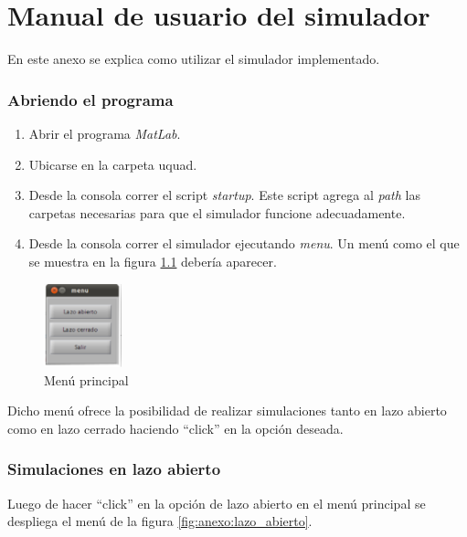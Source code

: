 \documentclass[main]{subfiles}
\begin{document}
\chapter{Manual de usuario del simulador}
\label{chap:anexo_simulador}

En este anexo se explica como utilizar el simulador implementado. 

\subsection*{Abriendo el programa}

\begin{enumerate}
\item Abrir el programa \emph{MatLab}.
\item Ubicarse en la carpeta uquad.
\item Desde la consola correr el script \emph{startup}. Este script agrega al \emph{path} las carpetas necesarias para que el simulador funcione adecuadamente.
\item Desde la consola correr el simulador ejecutando \emph{menu}. Un men\'u como el que se muestra en la figura \ref{fig:menu} deber\'ia aparecer.
\end{enumerate}

\begin{figure}
\centering
  \includegraphics[width=0.2\textwidth]{./pics_anexo_simulador/menu.pdf}
\caption{Men\'u principal}
\label{fig:menu}
\end{figure}
Dicho men\'u ofrece la posibilidad de realizar simulaciones tanto en lazo abierto como en lazo cerrado haciendo ``click'' en la opci\'on deseada.\\

\subsection*{Simulaciones en lazo abierto}
Luego de hacer ``click'' en la opci\'on de lazo abierto en el men\'u principal se despliega el men\'u de la figura \ref{fig:anexo:lazo_abierto}. 
\end{document}

